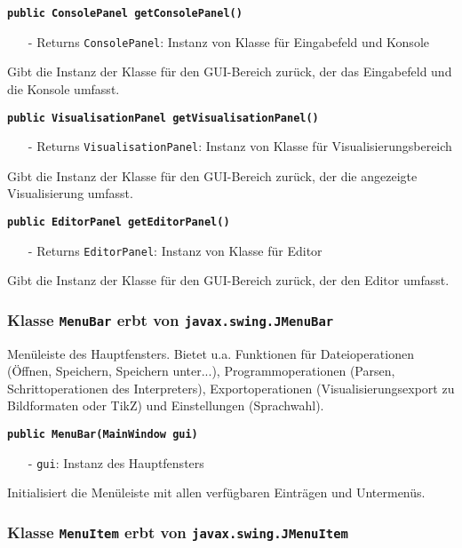\documentclass[parskip=full,11pt,twoside]{scrartcl}
\begin{document}
\textbf{\texttt{public ConsolePanel getConsolePanel()}}
\begin{itemize}[noitemsep]
	\item[-] Returns \texttt{ConsolePanel}: Instanz von Klasse für Eingabefeld und Konsole
\end{itemize}
Gibt die Instanz der Klasse für den GUI-Bereich zurück, der das Eingabefeld und die Konsole umfasst.

\textbf{\texttt{public VisualisationPanel getVisualisationPanel()}}
\begin{itemize}[noitemsep]
	\item[-] Returns \texttt{VisualisationPanel}: Instanz von Klasse für Visualisierungsbereich
\end{itemize}
Gibt die Instanz der Klasse für den GUI-Bereich zurück, der die angezeigte Visualisierung umfasst.

\textbf{\texttt{public EditorPanel getEditorPanel()}}
\begin{itemize}[noitemsep]
	\item[-] Returns \texttt{EditorPanel}: Instanz von Klasse für Editor
\end{itemize}
Gibt die Instanz der Klasse für den GUI-Bereich zurück, der den Editor umfasst.

\subsubsection{Klasse \texttt{MenuBar} erbt von \texttt{javax.swing.JMenuBar}}

Menüleiste des Hauptfensters. Bietet u.a. Funktionen für Dateioperationen (Öffnen, Speichern, Speichern unter...), Programmoperationen (Parsen, Schrittoperationen des Interpreters), Exportoperationen (Visualisierungsexport zu Bildformaten oder TikZ) und Einstellungen (Sprachwahl).

\textbf{\texttt{public MenuBar(MainWindow gui)}}
\begin{itemize}[noitemsep]
	\item[-] \texttt{gui}: Instanz des Hauptfensters
\end{itemize}
Initialisiert die Menüleiste mit allen verfügbaren Einträgen und Untermenüs.

\subsubsection{Klasse \texttt{MenuItem} erbt von \texttt{javax.swing.JMenuItem}}
\end{document}
